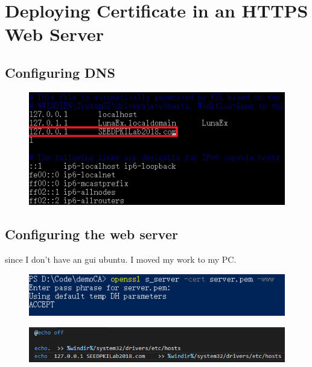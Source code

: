\documentclass{article}
\begin{document}
\section{Deploying Certificate in an HTTPS Web Server}
\subsection{Configuring DNS}
\begin{figure}[H]\centering\includegraphics{3-1.png}\end{figure}
\subsection{Configuring the web server}
since I don't have an gui ubuntu. I moved my work to my PC.
\begin{figure}[H]\centering\includegraphics{3-3.png}\end{figure}
\begin{figure}[H]\centering\includegraphics{3-4.png}\end{figure}
\end{document}
